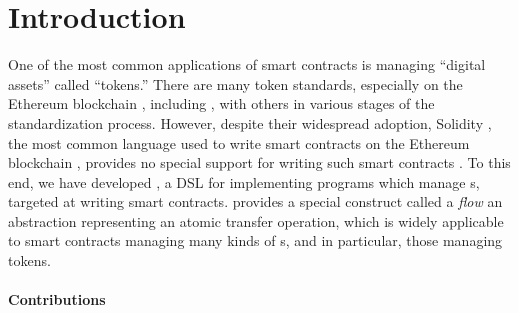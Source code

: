 \documentclass[dvipsnames, usenames, sigconf]{acmart}
\begin{document}

\maketitle


\section{Introduction}


One of the most common applications  of smart contracts is managing ``digital assets'' called ``tokens.''
There are many token standards, especially on the Ethereum blockchain , including , with others in various stages of the standardization process.
However, despite their widespread adoption, Solidity , the most common language used to write smart contracts on the Ethereum blockchain , provides no special support for writing such smart contracts .
To this end, we have developed \langName, a DSL for implementing programs which manage \assetTxt{}s, targeted at writing smart contracts.
\langName provides a special construct called a \emph{flow} an abstraction representing an atomic transfer operation, which is widely applicable to smart contracts managing many kinds of \assetTxt{}s, and in particular, those managing tokens.

\paragraph{Contributions}
\end{document}
